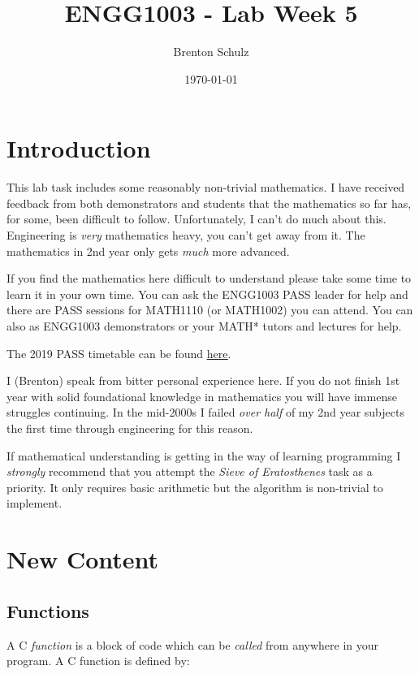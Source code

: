 \documentclass{lab}
\title{ENGG1003 - Lab Week 5}
\author{Brenton Schulz}
\date{\today}
\begin{document}
\maketitle

\section{Introduction}

This lab task includes some reasonably non-trivial mathematics. I have received feedback from both demonstrators and students that the mathematics so far has, for some, been difficult to follow. Unfortunately, I can't do much about this. Engineering is \textit{very} mathematics heavy, you can't get away from it. The mathematics in 2nd year only gets \textit{much} more advanced.

If you find the mathematics here difficult to understand please take some time to learn it in your own time. You can ask the ENGG1003 PASS leader for help and there are PASS sessions for MATH1110 (or MATH1002) you can attend. You can also as ENGG1003 demonstrators or your MATH* tutors and lectures for help.

The 2019 PASS timetable can be found \underline{\href{https://www.newcastle.edu.au/__data/assets/pdf_file/0003/137577/PASS-TT-Callaghan-S1-19.pdf}{here}}.

I (Brenton) speak from bitter personal experience here. If you do not finish 1st year with solid foundational knowledge in mathematics you will have immense struggles continuing. In the mid-2000s I failed \textit{over half} of my 2nd year subjects the first time through engineering for this reason.

If mathematical understanding is getting in the way of learning programming I \textit{strongly} recommend that you attempt the \textit{Sieve of Eratosthenes} task as a priority. It only requires basic arithmetic but the algorithm is non-trivial to implement.

\pagebreak
\section{New Content}

\subsection{Functions}

A C \textit{function} is a block of code which can be \textit{called} from anywhere in your program. A C function is defined by:
\end{document}
